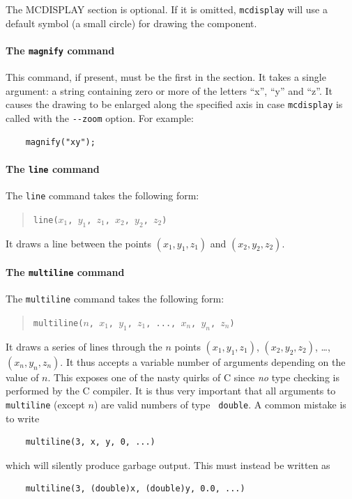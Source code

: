 The MCDISPLAY section is optional. If it is omitted, \verb+mcdisplay+
will use a default symbol (a small circle) for drawing the component.

\paragraph{The {\tt magnify} command}

This command, if present, must be the first in the section. It takes a
single argument: a string containing zero or more of the letters ``x'',
``y'' and ``z''. It causes the drawing to be enlarged along the
specified axis in case \verb+mcdisplay+ is called with the \verb+--zoom+
option. For example:
\begin{verbatim}
    magnify("xy");
\end{verbatim}


\paragraph{The {\tt line} command}

The {\tt line} command takes the following form:
\begin{quote}
  \texttt{line($x_1$, $y_1$, $z_1$, $x_2$, $y_2$, $z_2$)}
\end{quote}
It draws a line between the points $(x_1, y_1, z_1)$ and $(x_2, y_2,
z_2)$.


\paragraph{The {\tt multiline} command}

The {\tt multiline} command takes the following form:
\begin{quote}
  \texttt{multiline($n$, $x_1$, $y_1$, $z_1$, ..., $x_n$, $y_n$, $z_n$)}
\end{quote}
It draws a series of lines through the $n$ points $(x_1, y_1, z_1)$,
$(x_2, y_2, z_2)$, \ldots, $(x_n, y_n, z_n)$. It thus accepts a variable
number of arguments depending on the value of $n$. This exposes 
one of the nasty quirks of C since \emph{no} type checking is
performed by the C compiler. It is thus very important that all
arguments to {\tt multiline} (except $n$) are valid numbers of type {\tt
  double}. A common mistake is to write
\begin{verbatim}
    multiline(3, x, y, 0, ...)
\end{verbatim}
which will silently produce garbage output. This must instead be
written as
\begin{verbatim}
    multiline(3, (double)x, (double)y, 0.0, ...)
\end{verbatim}



